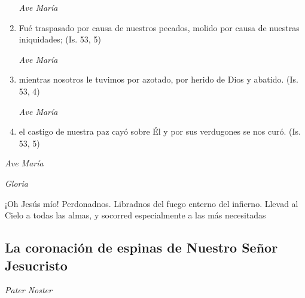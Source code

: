 \documentclass[a4paper,11pt, oneside]{report}
\begin{document}
\begin{enumerate}
          \textit{Ave María}

          \item Fué traspasado por causa de nuestros pecados, molido por causa de nuestras iniquidades; (Is. 53, 5)

          \textit{Ave María}

          \item mientras nosotros le tuvimos por azotado, por herido de Dios y abatido. (Is. 53, 4)

          \textit{Ave María}

          \item el castigo de nuestra paz cayó sobre Él y por sus verdugones se nos curó. (Is. 53, 5)

        \end{enumerate}

        \textit{Ave María} \par
        \indent\textit{Gloria} \par
        \indent¡Oh Jesús mío! Perdonadnos. Libradnos del fuego enterno del infierno. Llevad al Cielo a todas las almas, y socorred especialmente a las más 
        necesitadas
      
      \subsection*{La coronación de espinas de Nuestro Señor Jesucristo}
      
        \textit{Pater Noster}
\end{document}
